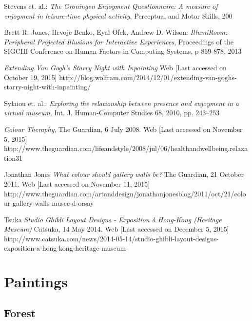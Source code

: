 \documentclass[a4paper]{article}
\begin{document}
\begin{thebibliography}{99}
 Stevens et. al.:
\emph{The Groningen Enjoyment Questionnaire: A measure of enjoyment in leisure-time physical activity},
Perceptual and Motor Skills, 200

 Brett R. Jones, Hrvoje Benko, Eyal Ofek, Andrew D. Wilson:
\emph{IllumiRoom: Peripheral Projected Illusions for
Interactive Experiences},
Proceedings of the SIGCHI Conference on Human Factors in Computing Systems, p 869-878, 2013

\emph{Extending Van Gogh’s \emph{Starry Night} with Inpainting}
Web [Last accessed on October 19, 2015]
http://blog.wolfram.com/2014/12/01/extending-van-goghs-starry-night-with-inpainting/

 Sylaiou et. al.:
\emph{Exploring the relationship between presence and enjoyment in a virtual museum},
Int. J. Human-Computer Studies 68, 2010, pp. 243--253

\emph{Colour Theraphy}, 
The Guardian, 6 July 2008.
Web [Last accessed on November 5, 2015]
http://www.theguardian.com/lifeandstyle/2008/jul/06/healthandwellbeing.relaxation31

 Jonathan Jones
\emph{What colour should gallery walls be?}
The Guardian, 21 October 2011.
Web [Last accessed on November 11, 2015]
http://www.theguardian.com/artanddesign/jonathanjonesblog/2011/oct/21/colour-gallery-walls-musee-d-orsay

 Tsuka
\emph{Studio Ghibli Layout Designs - Exposition à Hong-Kong (Heritage Museum)}
Catsuka, 14 May 2014.
Web [Last accessed on December 5, 2015] 
http://www.catsuka.com/news/2014-05-14/studio-ghibli-layout-designs-exposition-a-hong-kong-heritage-museum

\end{thebibliography}











\newpage

\appendix
\section{Paintings} \label{sec:paintings}

\subsection{Forest}
\end{document}
